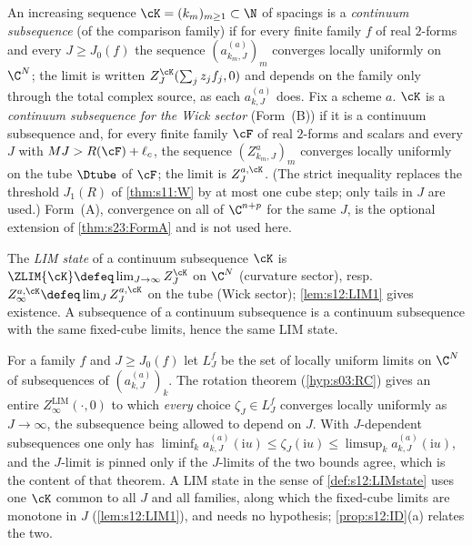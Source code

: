 \begin{definition}\label{def:s12:contsub}
An increasing sequence $\cK=(k_m)_{m\ge1}\subset\N$ of spacings is a \emph{continuum subsequence} (of the comparison family) if for every finite family $f$ of real $2$-forms and every $J\ge J_0(f)$ the sequence $(a^{(a)}_{k_m,J})_m$ converges locally uniformly on $\C^N$; the limit is written $Z^{\cK}_J(\sum_jz_jf_j,0)$ and depends on the family only through the total complex source, as each $a^{(a)}_{k,J}$ does. Fix a scheme $a$. $\cK$ is a \emph{continuum subsequence for the Wick sector} (Form~(B)) if it is a continuum subsequence and, for every finite family $\cF$ of real $2$-forms and scalars and every $J$ with $MJ>R(\cF)+\ell_c$, the sequence $(Z^a_{k_m,J})_m$ converges locally uniformly on the tube $\Dtube$ of $\cF$; the limit is $Z^{a,\cK}_J$. (The strict inequality replaces the threshold $J_1(R)$ of \cref{thm:s11:W} by at most one cube step; only tails in $J$ are used.) Form~(A), convergence on all of $\C^{n+p}$ for the same $J$, is the optional extension of \cref{thm:s23:FormA} and is not used here.
\end{definition}

\begin{definition}\label{def:s12:LIMstate}
The \emph{LIM state} of a continuum subsequence $\cK$ is $\ZLIM{\cK}\defeq\lim_{J\to\infty}Z^{\cK}_J$ on $\C^N$ (curvature sector), resp.\ $Z^{a,\cK}_\infty\defeq\lim_JZ^{a,\cK}_J$ on the tube (Wick sector); \cref{lem:s12:LIM1} gives existence. A subsequence of a continuum subsequence is a continuum subsequence with the same fixed-cube limits, hence the same LIM state.
\end{definition}

\begin{definition}\label{def:s12:o3LIM}
For a family $f$ and $J\ge J_0(f)$ let $L^f_J$ be the set of locally uniform limits on $\C^N$ of subsequences of $(a^{(a)}_{k,J})_k$. The rotation theorem (\cref{hyp:s03:RC}) gives an entire $Z^{\mathrm{LIM}}_\infty(\cdot,0)$ to which \emph{every} choice $\zeta_J\in L^f_J$ converges locally uniformly as $J\to\infty$, the subsequence being allowed to depend on $J$. With $J$-dependent subsequences one only has $\liminf_ka^{(a)}_{k,J}(\mathrm iu)\le\zeta_J(\mathrm iu)\le\limsup_ka^{(a)}_{k,J}(\mathrm iu)$, and the $J$-limit is pinned only if the $J$-limits of the two bounds agree, which is the content of that theorem. A LIM state in the sense of \cref{def:s12:LIMstate} uses one $\cK$ common to all $J$ and all families, along which the fixed-cube limits are monotone in $J$ (\cref{lem:s12:LIM1}), and needs no hypothesis; \cref{prop:s12:ID}(a) relates the two.
\end{definition}

